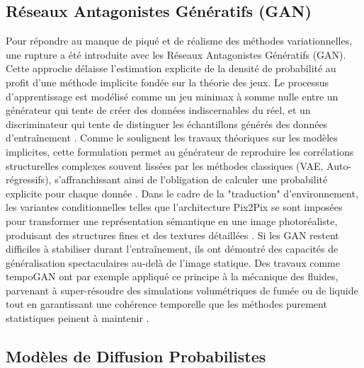 \subsection{Réseaux Antagonistes Génératifs (GAN)}

Pour répondre au manque de piqué et de réalisme des méthodes variationnelles, une rupture a été introduite avec les Réseaux Antagonistes Génératifs (GAN). Cette approche délaisse l'estimation explicite de la densité de probabilité au profit d'une méthode implicite fondée sur la théorie des jeux. Le processus d'apprentissage est modélisé comme un jeu minimax à somme nulle entre un générateur qui tente de créer des données indiscernables du réel, et un discriminateur qui tente de distinguer les échantillons générés des données d'entraînement \cite{goodfellow_generative_2020}. Comme le soulignent les travaux théoriques sur les modèles implicites, cette formulation permet au générateur de reproduire les corrélations structurelles complexes souvent lissées par les méthodes classiques (VAE, Auto-régressifs), s'affranchissant ainsi de l'obligation de calculer une probabilité explicite pour chaque donnée \cite{mohamed_learning_2017}.
Dans le cadre de la "traduction" d'environnement, les variantes conditionnelles telles que l'architecture Pix2Pix se sont imposées pour transformer une représentation sémantique en une image photoréaliste, produisant des structures fines et des textures détaillées \cite{isola_image--image_2017}. Si les GAN restent difficiles à stabiliser durant l'entraînement, ils ont démontré des capacités de généralisation spectaculaires au-delà de l'image statique. Des travaux comme tempoGAN ont par exemple appliqué ce principe à la mécanique des fluides, parvenant à super-résoudre des simulations volumétriques de fumée ou de liquide tout en garantissant une cohérence temporelle que les méthodes purement statistiques peinent à maintenir \cite{xie_tempogan_2018}.

\subsection{Modèles de Diffusion Probabilistes}

